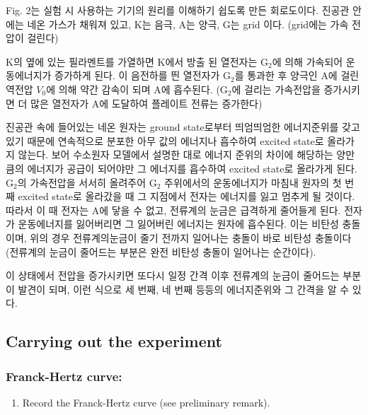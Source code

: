 \documentclass[a4paper, 10pt, nanum]{CSUniSchoolLabReport}
\begin{document}
	Fig. 2는 실험 시 사용하는 기기의 원리를 이해하기 쉽도록 만든 회로도이다. 진공관 안에는 네온 가스가 채워져 있고, K는 음극, A는 양극, G는 grid 이다. (grid에는 가속 전압이 걸린다)

	K의 옆에 있는 필라멘트를 가열하면 K에서 방출 된 열전자는 G$_2$에 의해 가속되어 운동에너지가 증가하게 된다. 이 음전하를 띈 열전자가 G$_2$를 통과한 후 양극인 A에 걸린 역전압 $V_0$에 의해 약간 감속이 되며 A에 흡수된다. (G$_2$에 걸리는 가속전압을 증가시키면 더 많은 열전자가 A에 도달하여 플레이트 전류는 증가한다)

	진공관 속에 들어있는 네온 원자는 ground state로부터 띄엄띄엄한 에너지준위를 갖고 있기 때문에 연속적으로 분포한 아무 값의 에너지나 흡수하여 excited state로 올라가지 않는다. 보어 수소원자 모델에서 설명한 대로 에너지 준위의 차이에 해당하는 양만큼의 에너지가 공급이 되어야만 그 에너지를 흡수하여 excited state로 올라가게 된다. G$_2$의 가속전압을 서서히 올려주어 G$_2$ 주위에서의 운동에너지가 마침내 원자의 첫 번째 excited state로 올라갔을 때 그 지점에서 전자는 에너지를 잃고 멈추게 될 것이다. 따라서 이 때 전자는 A에 닿을 수 없고, 전류계의 눈금은 급격하게 줄어들게 된다. 전자가 운동에너지를 잃어버리면 그 잃어버린 에너지는 원자에 흡수된다. 이는 비탄성 충돌이며, 위의 경우 전류계의눈금이 줄기 전까지 일어나는 충돌이 바로 비탄성 충돌이다(전류계의 눈금이 줄어드는 부분은 완전 비탄성 충돌이 일어나는 순간이다).

	이 상태에서 전압을 증가시키면 또다시 일정 간격 이후 전류계의 눈금이 줄어드는 부분이 발견이 되며, 이런 식으로 세 번째, 네 번째 등등의 에너지준위와 그 간격을 알 수 있다.


\subsection{Carrying out the experiment}

\subsubsection{Franck-Hertz curve:}
	\begin{enumerate}[label=\arabic*.]
		\item Record the Franck-Hertz curve (see preliminary remark). 
	\end{enumerate}
\end{document}
